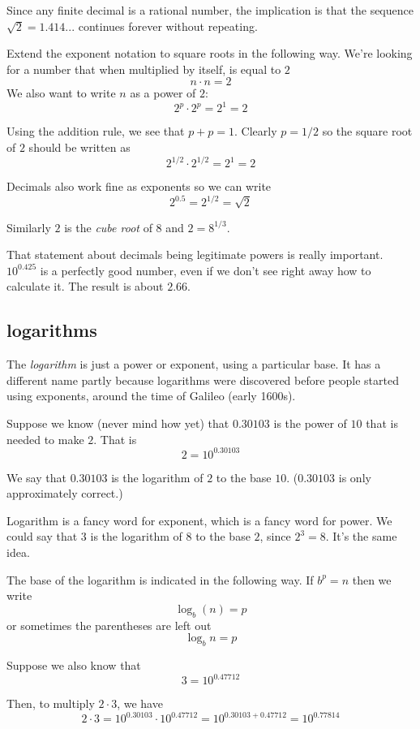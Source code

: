 \documentclass[11pt, oneside]{article}
\begin{document}
Since any finite decimal is a rational number, the implication is that the sequence $\sqrt{2} = 1.414...$ continues forever without repeating.

Extend the exponent notation to square roots in the following way.  We're looking for a number that when multiplied by itself, is equal to $2$
\[ n \cdot n = 2 \]
We also want to write $n$ as a power of $2$:
\[ 2^p \cdot 2^p = 2^1 = 2 \]

Using the addition rule, we see that $p + p = 1$.  Clearly $p = 1/2$ so the square root of $2$ should be written as
\[ 2^{1/2} \cdot 2^{1/2} = 2^1 = 2 \]

Decimals also work fine as exponents so we can write
\[ 2^{0.5} = 2^{1/2} = \sqrt{2} \]

Similarly $2$ is the \emph{cube root} of $8$ and $2 = 8^{1/3}$.

That statement about decimals being legitimate powers is really important.  $10^{0.425}$ is a perfectly good number, even if we don't see right away how to calculate it.  The result is about $2.66$.

\subsection*{logarithms}

The \emph{logarithm} is just a power or exponent, using a particular base. It has a different name partly because logarithms were discovered before people started using exponents, around the time of Galileo (early 1600s). 

Suppose we know (never mind how yet) that $0.30103$ is the power of $10$ that is needed to make $2$.  That is
\[ 2 = 10^{0.30103} \]

We say that $0.30103$ is the logarithm of $2$ to the base $10$. ($0.30103$ is only approximately correct.)  

Logarithm is a fancy word for exponent, which is a fancy word for power. We could say that $3$ is the logarithm of $8$ to the base $2$, since $2^3 = 8$.  It's the same idea.  

The base of the logarithm is indicated in the following way.  If $b^p = n$ then we write
\[ \log_b (n) = p \]
or sometimes the parentheses are left out
\[ \log_b n = p \]

Suppose we also know that
\[ 3 = 10^{0.47712} \]

Then, to multiply $2 \cdot 3$, we have
\[ 2 \cdot 3 = 10^{0.30103} \cdot 10^{0.47712} = 10^{0.30103 + 0.47712} = 10^{0.77814} \]
\end{document}
